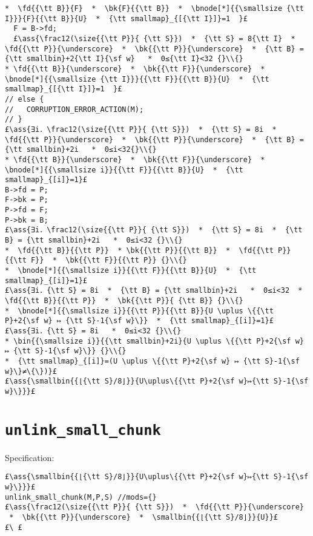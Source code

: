 \documentclass[10pt,a4paper,twoside]{report}
\makeatletter
\newcommand{\ml}[2][t]{\mbox{\mdseries\begin{tabular}[#1]{@{}L@{}}#2\end{tabular}}}
\newcommand{\ass}[1]{\ensuremath{{\color{blue}\left\{\ml[c]{#1}\right\}}}}
\makeatother
\begin{document}
\begin{lstlisting}
*  \fd{{\tt B}}{F}  *  \bk{F}{{\tt B}}  *  \bnode[*]{{\smallsize {\tt I}}}{F}{{\tt B}}{U}  *  {\tt smallmap}_{[{\tt I}]}=1  }£
  F = B->fd;
  £\ass{\frac12(\size{{\tt P}}{ {\tt S}})  *  {\tt S} = 8{\tt I}  *  \fd{{\tt P}}{\underscore}  *  \bk{{\tt P}}{\underscore}  *  {\tt B} = {\tt smallbin}+2{\tt I}{\sf w}   *  0≤{\tt I}<32 {}\\{}
* \fd{{\tt B}}{\underscore}  *  \bk{{\tt F}}{\underscore}  *  \bnode[*]{{\smallsize {\tt I}}}{{\tt F}}{{\tt B}}{U}  *  {\tt smallmap}_{[{\tt I}]}=1  }£
// else {
//   CORRUPTION_ERROR_ACTION(M);
// }
£\ass{∃i．\frac12(\size{{\tt P}}{ {\tt S}})  *  {\tt S} = 8i  *  \fd{{\tt P}}{\underscore}  *  \bk{{\tt P}}{\underscore}  *  {\tt B} = {\tt smallbin}+2i   *  0≤i<32{}\\{}
* \fd{{\tt B}}{\underscore}  *  \bk{{\tt F}}{\underscore}  *  \bnode[*]{{\smallsize i}}{{\tt F}}{{\tt B}}{U}  *  {\tt smallmap}_{[i]}=1}£
B->fd = P;
F->bk = P;
P->fd = F;
P->bk = B;
£\ass{∃i．\frac12(\size{{\tt P}}{ {\tt S}})  *  {\tt S} = 8i  *  {\tt B} = {\tt smallbin}+2i   *  0≤i<32 {}\\{}
*  \fd{{\tt B}}{{\tt P}}  * \bk{{\tt P}}{{\tt B}}  *  \fd{{\tt P}}{{\tt F}}  *  \bk{{\tt F}}{{\tt P}} {}\\{}
*  \bnode[*]{{\smallsize i}}{{\tt F}}{{\tt B}}{U}  *  {\tt smallmap}_{[i]}=1}£
£\ass{∃i．{\tt S} = 8i  *  {\tt B} = {\tt smallbin}+2i   *  0≤i<32  *  \fd{{\tt B}}{{\tt P}}  *  \bk{{\tt P}}{ {\tt B}} {}\\{}
*  \bnode[*]{{\smallsize i}}{{\tt P}}{{\tt B}}{U \uplus \{{\tt P}+2{\sf w} ↦ {\tt S}-1{\sf w}\}}  *  {\tt smallmap}_{[i]}=1}£
£\ass{∃i．{\tt S} = 8i   *  0≤i<32 {}\\{}
* \bin{{\smallsize i}}{{\tt smallbin}+2i}{U \uplus \{{\tt P}+2{\sf w} ↦ {\tt S}-1{\sf w}\}} {}\\{}
*  {\tt smallmap}_{[i]}=(U \uplus \{{\tt P}+2{\sf w} ↦ {\tt S}-1{\sf w}\}≠\{\})}£
£\ass{\smallbin{{⌊{\tt S}/8⌋}}{U\uplus\{{\tt P}+2{\sf w}↦{\tt S}-1{\sf w}\}}}£
\end{lstlisting}


\section{{\tt unlink\_small\_chunk}}

Specification:
\begin{lstlisting}
£\ass{\smallbin{{⌊{\tt S}/8⌋}}{U\uplus\{{\tt P}+2{\sf w}↦{\tt S}-1{\sf w}\}}}£
unlink_small_chunk(M,P,S) //mods={}
£\ass{\frac12(\size{{\tt P}}{ {\tt S}})  *  \fd{{\tt P}}{\underscore}  *  \bk{{\tt P}}{\underscore}  *  \smallbin{{⌊{\tt S}/8⌋}}{U}}£
£\ £
\end{lstlisting}
\end{document}
